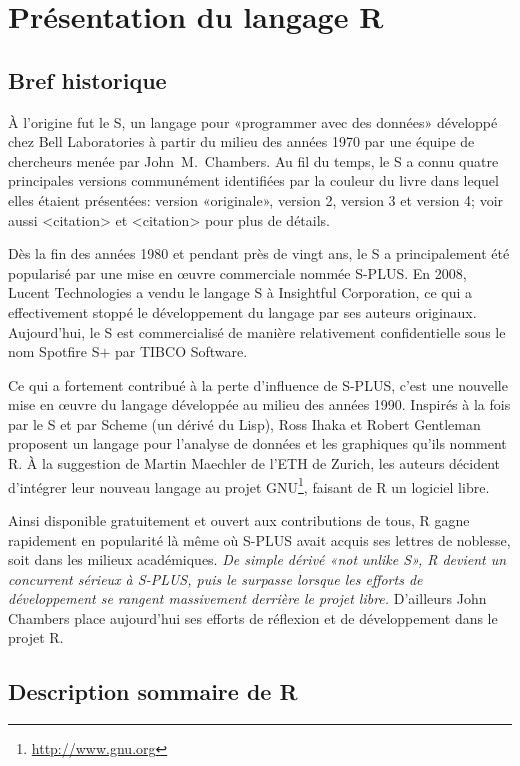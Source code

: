 \documentclass[11pt,article,french]{memoir}
\begin{document}
\chapter{Présentation du langage R}
\label{chap:presentation}

\section{Bref historique}
\label{sec:presentation:historique}

À l'origine fut le S, un langage pour «programmer avec des données»
développé chez Bell Laboratories à partir du milieu des années 1970
par une équipe de chercheurs menée par John~M.\ Chambers. Au fil du
temps, le S a connu quatre principales versions communément
identifiées par la couleur du livre dans lequel elles étaient
présentées: %
version «originale», %
version 2, %
version 3 et %
version 4; %
voir aussi <citation> et <citation> pour plus de détails.

Dès la fin des années 1980 et pendant près de vingt ans, le S a
principalement été popularisé par une mise en {\oe}uvre commerciale
nommée S-PLUS. En 2008, Lucent Technologies a vendu le langage S à
Insightful Corporation, ce qui a effectivement stoppé le développement
du langage par ses auteurs originaux. Aujourd'hui, le S est
commercialisé de manière relativement confidentielle sous le nom
Spotfire S$+$ par TIBCO Software.

Ce qui a fortement contribué à la perte d'influence de S-PLUS, c'est
une nouvelle mise en {\oe}uvre du langage développée au milieu des
années 1990. Inspirés à la fois par le S et par Scheme (un dérivé du
Lisp), Ross Ihaka et Robert Gentleman proposent un langage pour
l'analyse de données et les graphiques qu'ils nomment R. À la
suggestion de Martin Maechler de l'ETH de Zurich, les auteurs décident
d'intégrer leur nouveau langage au projet GNU\footnote{%
  \url{http://www.gnu.org}}, %
faisant de R un logiciel libre.

Ainsi disponible gratuitement et ouvert aux contributions de tous,
R gagne rapidement en popularité là même où S-PLUS avait acquis ses
lettres de noblesse, soit dans les milieux académiques. \emph{De simple
dérivé «\emph{not unlike S}», R devient un concurrent sérieux à
S-PLUS, puis le surpasse lorsque les efforts de développement se
rangent massivement derrière le projet libre.} D'ailleurs John Chambers
place aujourd'hui ses efforts de réflexion et de développement dans le
projet R.


\section{Description sommaire de R}
\label{sec:presentation:description}
\end{document}
